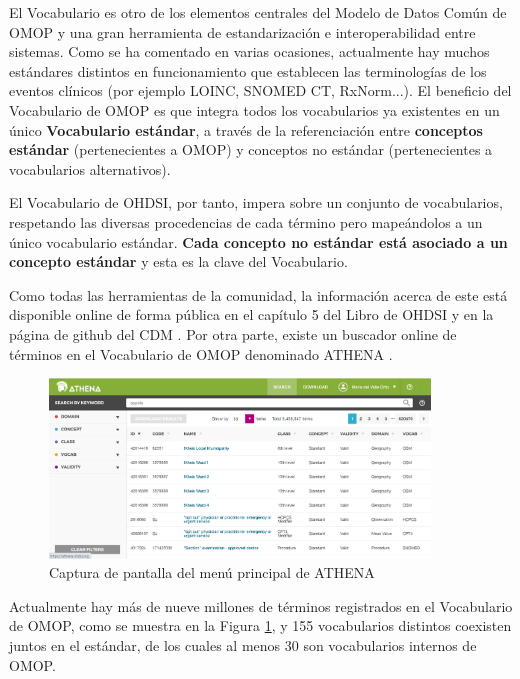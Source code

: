 El Vocabulario es otro de los elementos centrales del Modelo de Datos Común de OMOP y una gran herramienta de estandarización e interoperabilidad entre sistemas. Como se ha comentado en varias ocasiones, actualmente hay muchos estándares distintos en funcionamiento que establecen las terminologías de los eventos clínicos (por ejemplo LOINC, SNOMED CT, RxNorm...). El beneficio del Vocabulario de OMOP es que integra todos los vocabularios ya existentes en un único \textbf{Vocabulario estándar}, a través de la referenciación entre \textbf{conceptos estándar} (pertenecientes a OMOP) y conceptos no estándar (pertenecientes a vocabularios alternativos).

El Vocabulario de OHDSI, por tanto, impera sobre un conjunto de vocabularios, respetando las diversas procedencias de cada término pero mapeándolos a un único vocabulario estándar. \textbf{Cada concepto no estándar está asociado a un concepto estándar} y esta es la clave del Vocabulario. 

Como todas las herramientas de la comunidad, la información acerca de este está disponible online de forma pública en el capítulo 5 del Libro de OHDSI \cite{OHDSIbook} y en la página de github del CDM \cite{gitPagesCMD}. Por otra parte, existe un buscador online de términos en el Vocabulario de OMOP denominado ATHENA \cite{ATHENAweb}. 

\begin{figure}[H]
\centering
\includegraphics[width=0.90\textwidth]{figures/ATHENAcap.png}
     \caption{Captura de pantalla del menú principal de ATHENA}
    \label{fig:ATHENAcap}
\end{figure}

Actualmente hay más de nueve millones de términos registrados en el Vocabulario de OMOP, como se muestra en la Figura \ref{fig:ATHENAcap}, y 155 vocabularios distintos coexisten juntos en el estándar, de los cuales al menos 30 son vocabularios internos de OMOP.




